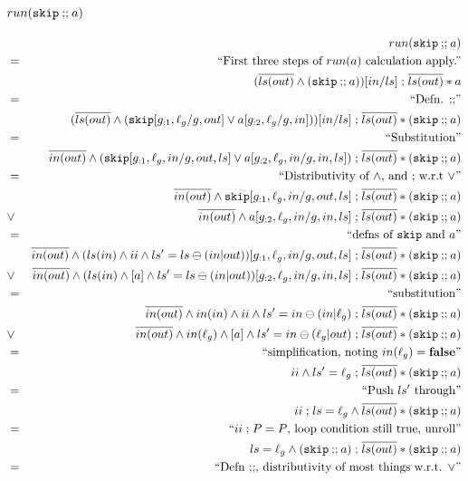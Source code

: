 \subsubsection{$run(\texttt{skip} \mathbin{;\!;} a)$}

\begin{eqnarray*}
  && run(\cskip \cseq a)
\EQ{First three steps of $run(a)$ calculation apply.}
\\&& (\B{ls(out)} \land (\cskip \cseq a)) [in/ls] \seq \B{ls(out)} * a
\EQ{Defn. $\cseq$}
\\&& ( \B{ls(out)}
       \land ( \cskip[\g{:1},\ell_g/g,out]
               \lor
                a[\g{:2},\ell_g/g,in]
              )
     ) [in/ls]
     \seq \B{ls(out)} * (\cskip \cseq a)
\EQ{Substitution}
\\&& \B{in(out)}
       \land ( \cskip[\g{:1},\ell_g,in/g,out,ls]
               \lor
                a[\g{:2},\ell_g,in/g,in,ls]
              )
     \seq \B{ls(out)} * (\cskip \cseq a)
\EQ{Distributivity of $\land$, and $\seq$ w.r.t $\lor$}
\\&& \B{in(out)}
       \land \cskip[\g{:1},\ell_g,in/g,out,ls]
     \seq \B{ls(out)} * (\cskip \cseq a)
\\&\lor&
     \B{in(out)}
       \land a[\g{:2},\ell_g,in/g,in,ls]
     \seq \B{ls(out)} * (\cskip \cseq a)
\EQ{defns of $\cskip$ and $a$}
\\&& \B{in(out)}
       \land (ls(in) \land ii \land ls'=ls \ominus (in|out))[\g{:1},\ell_g,in/g,out,ls]
     \seq \B{ls(out)} * (\cskip \cseq a)
\\&\lor&
     \B{in(out)}
       \land (ls(in) \land [a] \land ls'=ls \ominus (in|out))[\g{:2},\ell_g,in/g,in,ls]
     \seq \B{ls(out)} * (\cskip \cseq a)
\EQ{substitution}
\\&& \B{in(out)}
       \land in(in) \land ii \land ls'=in \ominus (in|\ell_g)
     \seq \B{ls(out)} * (\cskip \cseq a)
\\&\lor&
     \B{in(out)}
       \land in(\ell_g) \land [a] \land ls'=in \ominus (\ell_g|out)
     \seq \B{ls(out)} * (\cskip \cseq a)
\EQ{simplification, noting $in(\ell_g)=\false$}
\\&& ii \land ls'=\ell_g
     \seq \B{ls(out)} * (\cskip \cseq a)
\EQ{Push $ls'$ through}
\\&& ii \seq ls=\ell_g
     \land \B{ls(out)} * (\cskip \cseq a)
\EQ{$ii \seq P=P$, loop condition still true, unroll}
\\&& ls=\ell_g
     \land (\cskip \cseq a) \seq \B{ls(out)} * (\cskip \cseq a)
\EQ{Defn $\cseq$, distributivity of most things w.r.t. $\lor$}

\end{eqnarray*}
